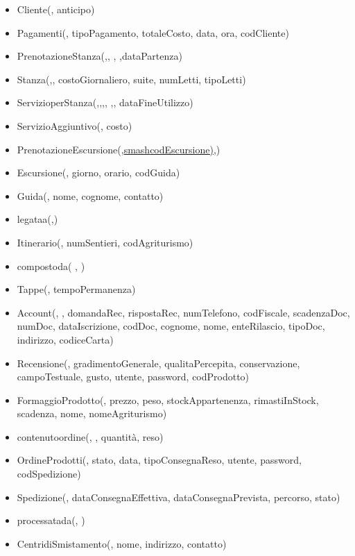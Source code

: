 \documentclass[12pt,a4paper]{article}
\begin{document}
\begin{itemize}
\item Cliente(\underline{}, anticipo)
\item Pagamenti(\underline{}, tipoPagamento, totaleCosto, data, ora,  codCliente)
\item PrenotazioneStanza(\underline{},\underline{}, \underline{}, \underline{},dataPartenza)
\item Stanza(\underline{},\underline{}, costoGiornaliero, suite, numLetti, tipoLetti)
\item ServizioperStanza(\underline{},\underline{},\underline{},\underline{}, \underline{},\underline{}, dataFineUtilizzo)
\item ServizioAggiuntivo(\underline{}, costo)
\item PrenotazioneEscursione(\underline{},\underline{smash{codEscursione)}},\underline{})
\item Escursione(\underline{}, giorno, orario,  codGuida)
\item Guida(\underline{}, nome, cognome, contatto)
\item legataa(\underline{},\underline{})
\item Itinerario(\underline{}, numSentieri, codAgriturismo)
\item compostoda( \underline{},  \underline{})
\item Tappe(\underline{}, tempoPermanenza) 
\item Account(\underline{}, \underline{}, domandaRec, rispostaRec, numTelefono, codFiscale, scadenzaDoc, numDoc, dataIscrizione, codDoc, cognome, nome, enteRilascio, tipoDoc, indirizzo, codiceCarta)
\item Recensione(\underline{}, gradimentoGenerale, qualitaPercepita, conservazione, campoTestuale, gusto,  utente,  password,  codProdotto)
\item FormaggioProdotto(\underline{}, prezzo, peso, stockAppartenenza, rimastiInStock, scadenza,  nome,  nomeAgriturismo)
\item contenutoordine(\underline{}, \underline{}, quantità, reso)
\item OrdineProdotti(\underline{}, stato, data, tipoConsegnaReso,  utente,  password,  codSpedizione)
\item Spedizione(\underline{}, dataConsegnaEffettiva, dataConsegnaPrevista, percorso, stato)
\item processatada(\underline{}, \underline{})
\item CentridiSmistamento(\underline{}, nome, indirizzo, contatto)

\end{itemize}
\end{document}
